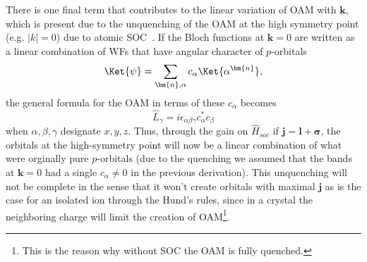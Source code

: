There is one final term that contributes to the linear variation of OAM with $\bm{k}$, which is present due to the unquenching of the OAM at the high symmetry point (e.g. $|k|=0$) due to atomic SOC~\cite{Park2011}.
If the Bloch functions at $\bm{k}=0$ are written as a linear combination of WFs that have angular character of $p$-orbitals
\begin{equation}
\Ket{\psi} = \sum_{\bm{n},\alpha} c_\alpha \Ket{\alpha^{\bm{n}}},
\end{equation}
the general formula for the OAM in terms of these $c_\alpha$ becomes
\begin{equation}
	\hat{L}_{\gamma}= i \epsilon_{\alpha \beta \gamma} c^*_\alpha c_\beta
\end{equation}
when $\alpha,\beta,\gamma$ designate $x,y,z$.
Thus, through the gain on $\hat{H}_{soc}$ if $\bm{j} = \bm{l} + \bm{\sigma}$, the orbitals at the high-symmetry point will now be a linear combination of what were orginally pure $p$-orbitals (due to the quenching we assumed that the bands at $\bm{k}=0$ had a single $c_\alpha \neq 0$ in the previous derivation).
This unquenching will not be complete in the sense that it won't create orbitals with maximal $\bm{j}$ as is the case for an isolated ion through the Hund's rules, since in a crystal the neighboring charge will limit the creation of OAM\footnote{This is the reason why without SOC the OAM is fully quenched.}.

